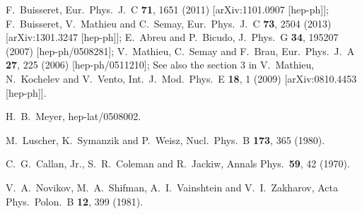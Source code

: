 \documentclass[prl,aps,
showpacs,
preprint,
nofootinbib,
floatfix,
superscriptaddress, showkeys
]{revtex4-1}
\begin{document}
\begin{thebibliography}{99}
  F.~Buisseret,
  Eur.\ Phys.\ J.\ C {\bf 71}, 1651 (2011)
  [arXiv:1101.0907 [hep-ph]];
  F.~Buisseret, V.~Mathieu and C.~Semay,
  Eur.\ Phys.\ J.\ C {\bf 73}, 2504 (2013)
  [arXiv:1301.3247 [hep-ph]];
  E.~Abreu and P.~Bicudo,
  J.\ Phys.\ G {\bf 34}, 195207 (2007)
  [hep-ph/0508281];
  V.~Mathieu, C.~Semay and F.~Brau,
  Eur.\ Phys.\ J.\ A {\bf 27}, 225 (2006)
  [hep-ph/0511210];
 See also the section 3 in V.~Mathieu, N.~Kochelev and V.~Vento,
  Int.\ J.\ Mod.\ Phys.\ E {\bf 18}, 1 (2009)
  [arXiv:0810.4453 [hep-ph]].
  
  

 H.~B.~Meyer,
  hep-lat/0508002.

  M.~Luscher, K.~Symanzik and P.~Weisz,
  Nucl.\ Phys.\ B {\bf 173}, 365 (1980).
  
  C.~G.~Callan, Jr., S.~R.~Coleman and R.~Jackiw,
  Annals Phys.\  {\bf 59}, 42 (1970).
  
  V.~A.~Novikov, M.~A.~Shifman, A.~I.~Vainshtein and V.~I.~Zakharov,
  Acta Phys.\ Polon.\ B {\bf 12}, 399 (1981).
  

\end{thebibliography}
\end{document}
